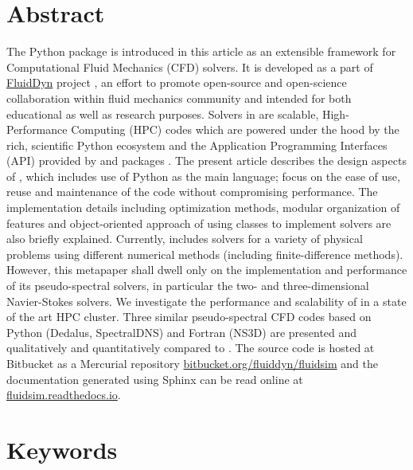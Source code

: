 \section{Abstract}


The Python package  is introduced in this article as an extensible
framework for Computational Fluid Mechanics (CFD) solvers.
%
It is developed as a part of \href{https://fluiddyn.readthedocs.io}{FluidDyn}
project \citep{fluiddyn}, an effort to promote open-source and open-science
collaboration within fluid mechanics community and intended for both educational
as well as research purposes.
%
Solvers in  are scalable, High-Performance Computing (HPC) codes
which are powered under the hood by the rich, scientific Python ecosystem and the
Application Programming Interfaces (API) provided by  and
 packages \citep{fluidfft}.
%
The present article describes the design aspects of , which
includes use of Python as the main language; focus on the ease of use, reuse
and maintenance of the code without compromising performance.
%
The implementation details including optimization methods, modular organization
of features and object-oriented approach of using classes to implement solvers
are also briefly explained.
%
Currently,  includes solvers for a variety of physical problems
using different numerical methods (including finite-difference methods).
%
However, this metapaper shall dwell only on the implementation and performance
of its pseudo-spectral solvers, in particular the two- and three-dimensional
Navier-Stokes solvers.
%
We investigate the performance and scalability of  in a
state of the art HPC cluster.
%
Three similar pseudo-spectral CFD codes based on Python (Dedalus, SpectralDNS) and
Fortran (NS3D) are presented and qualitatively and quantitatively compared to
.
%
The source code is hosted at Bitbucket as a Mercurial repository
\href{https://bitbucket.org/fluiddyn/fluidsim}{bitbucket.org/fluiddyn/fluidsim}
and the documentation generated using Sphinx can be read online at
\href{https://fluidsim.readthedocs.io}{fluidsim.readthedocs.io}.

\section{Keywords}

